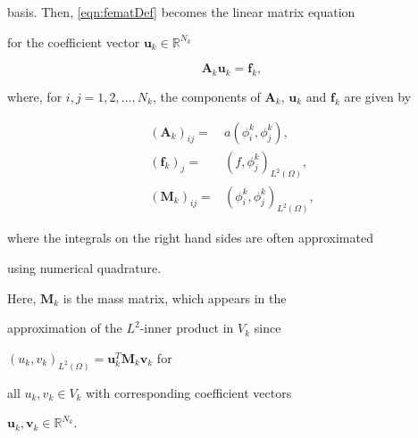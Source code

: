 \documentclass[smallcondensed,final]{svjour3}     %
\begin{document}
basis. Then, \eqref{eqn:fematDef} becomes the linear matrix equation

for the coefficient vector $\mathbf{u}_k\in \mathbb{R}^{N_k}$

\begin{equation}

\mathbf{A}_k\mathbf{u}_k = \mathbf{f}_k,

\end{equation}

where, for $i,j = 1,2,\ldots,N_k$, the components of $\mathbf A_k$, $\mathbf u_k$ and $\mathbf f_k$ are given by

\begin{align*}



(\mathbf{A}_k)_{ij} =& a(\phi_i^k,\phi_j^k), \\%

(\mathbf{f}_{k})_j   =& (f,\phi_j^k)_{L^2(\Omega)}, \\%

(\mathbf{M}_k)_{ij} =& (\phi_i^k,\phi_j^k)_{L^2(\Omega)},

\end{align*}

where the integrals on the right hand sides are often approximated

using numerical quadrature.

Here, $\mathbf{M}_k$ is the mass matrix, which appears in the

approximation of the $L^2$-inner product in $V_k$ since

$(u_k,v_k)_{L^2(\Omega)} = \mathbf{u}_k^T\mathbf{M}_k\mathbf{v}_k$ for

all $u_k,v_k\in V_k$ with corresponding coefficient vectors

$\mathbf{u}_k,\mathbf{v}_k\in \mathbb{R}^{N_k}$.



\end{document}
